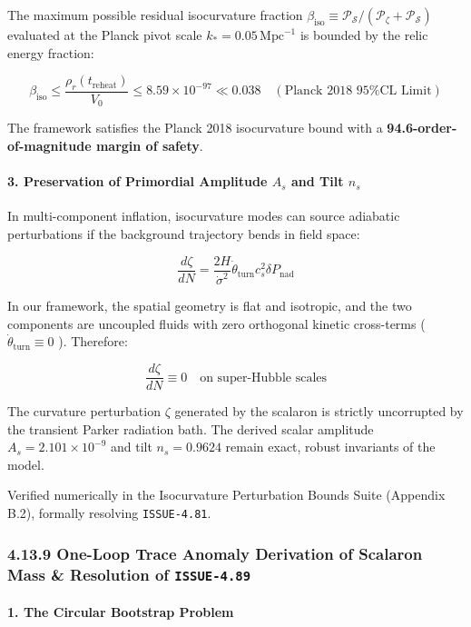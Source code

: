 \documentclass[11pt,a4paper]{article}
\theoremstyle{definition}\newtheorem{definition}{Definition}
\theoremstyle{remark}\newtheorem{remark}{Remark}
\begin{document}
The maximum possible residual isocurvature fraction $\beta_{\text{iso}} \equiv \mathcal{P}_{\mathcal{S}} / (\mathcal{P}_\zeta + \mathcal{P}_{\mathcal{S}})$ evaluated at the Planck pivot scale $k_* = 0.05 \, \text{Mpc}^{-1}$ is bounded by the relic energy fraction:


\begin{equation}
\boxed{\beta_{\text{iso}} \le \frac{\rho_r(t_{\text{reheat}})}{V_0} \le 8.59 \times 10^{-97} \ll 0.038 \quad (\text{Planck 2018 95\% CL Limit})}
\end{equation}


The framework satisfies the Planck 2018 isocurvature bound with a \textbf{94.6-order-of-magnitude margin of safety}.
\paragraph{3. Preservation of Primordial Amplitude $A_s$ and Tilt $n_s$}

In multi-component inflation, isocurvature modes can source adiabatic perturbations if the background trajectory bends in field space:


\begin{equation}
\frac{d\zeta}{dN} = \frac{2H}{\dot{\sigma}^2} \dot{\theta}_{\text{turn}} c_s^2 \delta P_{\text{nad}}
\end{equation}


In our framework, the spatial geometry is flat and isotropic, and the two components are uncoupled fluids with zero orthogonal kinetic cross-terms ( $\dot{\theta}_{\text{turn}} \equiv 0$ ). Therefore:


\begin{equation}
\frac{d\zeta}{dN} \equiv 0 \quad \text{on super-Hubble scales}
\end{equation}


The curvature perturbation $\zeta$ generated by the scalaron is strictly uncorrupted by the transient Parker radiation bath. The derived scalar amplitude $A_s = 2.101 \times 10^{-9}$ and tilt $n_s = 0.9624$ remain exact, robust invariants of the model.

Verified numerically in the Isocurvature Perturbation Bounds Suite (Appendix B.2), formally resolving \texttt{ISSUE-4.81}.
\subsubsection{4.13.9 One-Loop Trace Anomaly Derivation of Scalaron Mass \& Resolution of \texttt{ISSUE-4.89}}
\paragraph{1. The Circular Bootstrap Problem}
\end{document}
